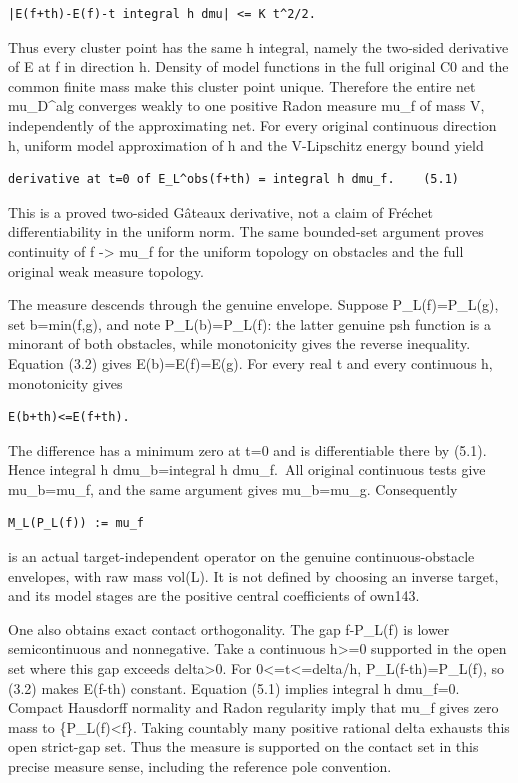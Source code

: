 \documentclass[
  10pt,
]{article}
\begin{document}
\begin{verbatim}
|E(f+th)-E(f)-t integral h dmu| <= K t^2/2.
\end{verbatim}

Thus every cluster point has the same h integral, namely the two-sided
derivative of E at f in direction h. Density of model functions in the
full original C0 and the common finite mass make this cluster point
unique. Therefore the entire net mu\_D\^{}alg converges weakly to one
positive Radon measure mu\_f of mass V, independently of the
approximating net. For every original continuous direction h, uniform
model approximation of h and the V-Lipschitz energy bound yield

\begin{verbatim}
derivative at t=0 of E_L^obs(f+th) = integral h dmu_f.    (5.1)
\end{verbatim}

This is a proved two-sided Gâteaux derivative, not a claim of Fréchet
differentiability in the uniform norm. The same bounded-set argument
proves continuity of f -\textgreater{} mu\_f for the uniform topology on
obstacles and the full original weak measure topology.

The measure descends through the genuine envelope. Suppose
P\_L(f)=P\_L(g), set b=min(f,g), and note P\_L(b)=P\_L(f): the latter
genuine psh function is a minorant of both obstacles, while monotonicity
gives the reverse inequality. Equation (3.2) gives E(b)=E(f)=E(g). For
every real t and every continuous h, monotonicity gives

\begin{verbatim}
E(b+th)<=E(f+th).
\end{verbatim}

The difference has a minimum zero at t=0 and is differentiable there by
(5.1). Hence integral h dmu\_b=integral h dmu\_f.~All original
continuous tests give mu\_b=mu\_f, and the same argument gives
mu\_b=mu\_g. Consequently

\begin{verbatim}
M_L(P_L(f)) := mu_f
\end{verbatim}

is an actual target-independent operator on the genuine
continuous-obstacle envelopes, with raw mass vol(L). It is not defined
by choosing an inverse target, and its model stages are the positive
central coefficients of own143.

One also obtains exact contact orthogonality. The gap f-P\_L(f) is lower
semicontinuous and nonnegative. Take a continuous h\textgreater=0
supported in the open set where this gap exceeds delta\textgreater0. For
0\textless=t\textless=delta/\textbar\textbar h\textbar\textbar,
P\_L(f-th)=P\_L(f), so (3.2) makes E(f-th) constant. Equation (5.1)
implies integral h dmu\_f=0. Compact Hausdorff normality and Radon
regularity imply that mu\_f gives zero mass to \{P\_L(f)\textless f\}.
Taking countably many positive rational delta exhausts this open
strict-gap set. Thus the measure is supported on the contact set in this
precise measure sense, including the reference pole convention.
\end{document}
